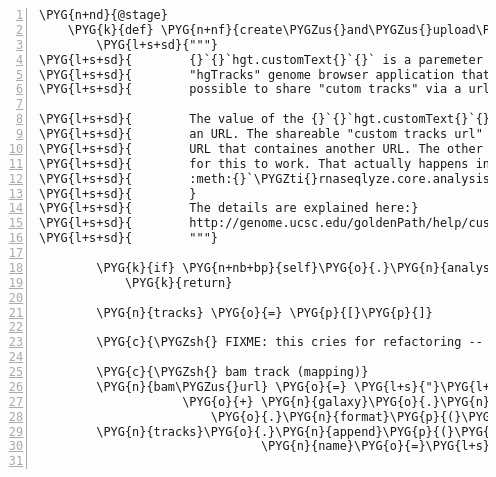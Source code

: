 \begin{Verbatim}[commandchars=\\\{\},numbers=left,firstnumber=1,stepnumber=5]
    \PYG{n+nd}{@stage}
    \PYG{k}{def} \PYG{n+nf}{create\PYGZus{}and\PYGZus{}upload\PYGZus{}hg\PYGZus{}text}\PYG{p}{(}\PYG{n+nb+bp}{self}\PYG{p}{)}\PYG{p}{:}
        \PYG{l+s+sd}{"""}
\PYG{l+s+sd}{        {}`{}`hgt.customText{}`{}` is a paremeter of the UCSC}
\PYG{l+s+sd}{        "hgTracks" genome browser application that makes it}
\PYG{l+s+sd}{        possible to share "cutom tracks" via a url.}

\PYG{l+s+sd}{        The value of the {}`{}`hgt.customText{}`{}` parameter is itself}
\PYG{l+s+sd}{        an URL. The shareable "custom tracks url" is therefore an}
\PYG{l+s+sd}{        URL that containes another URL. The other url must be "escaped"}
\PYG{l+s+sd}{        for this to work. That actually happens in}
\PYG{l+s+sd}{        :meth:{}`\PYGZti{}rnaseqlyze.core.analysis.AnalysisMixins.hg\PYGZus{}url{}`.}
\PYG{l+s+sd}{        }
\PYG{l+s+sd}{        The details are explained here:}
\PYG{l+s+sd}{        http://genome.ucsc.edu/goldenPath/help/customTrack.html\PYGZsh{}SHARE}
\PYG{l+s+sd}{        """}

        \PYG{k}{if} \PYG{n+nb+bp}{self}\PYG{o}{.}\PYG{n}{analysis}\PYG{o}{.}\PYG{n}{galaxy\PYGZus{}hg\PYGZus{}text}\PYG{p}{:}
            \PYG{k}{return}

        \PYG{n}{tracks} \PYG{o}{=} \PYG{p}{[}\PYG{p}{]}

        \PYG{c}{\PYGZsh{} FIXME: this cries for refactoring -- with logging!}

        \PYG{c}{\PYGZsh{} bam track (mapping)}
        \PYG{n}{bam\PYGZus{}url} \PYG{o}{=} \PYG{l+s}{"}\PYG{l+s}{https://}\PYG{l+s}{"} \PYG{o}{+} \PYG{n}{galaxy}\PYG{o}{.}\PYG{n}{hostname} \PYGZbs{}
                    \PYG{o}{+} \PYG{n}{galaxy}\PYG{o}{.}\PYG{n}{ucsc\PYGZus{}bam\PYGZus{}path\PYGZus{}template} \PYGZbs{}
                        \PYG{o}{.}\PYG{n}{format}\PYG{p}{(}\PYG{n}{dataset}\PYG{o}{=}\PYG{n+nb+bp}{self}\PYG{o}{.}\PYG{n}{analysis}\PYG{o}{.}\PYG{n}{galaxy\PYGZus{}bam}\PYG{o}{.}\PYG{n}{id}\PYG{p}{)}
        \PYG{n}{tracks}\PYG{o}{.}\PYG{n}{append}\PYG{p}{(}\PYG{n}{BAMTrack}\PYG{p}{(}\PYG{n}{url}\PYG{o}{=}\PYG{n}{bam\PYGZus{}url}\PYG{p}{,}
                               \PYG{n}{name}\PYG{o}{=}\PYG{l+s}{"}\PYG{l+s}{RNA-Seqlyze \textbar{} }\PYG{l+s+si}{\PYGZpc{}s}\PYG{l+s}{"} \PYG{o}{\PYGZpc{}} \PYG{n+nb+bp}{self}\PYG{o}{.}\PYG{n}{bam\PYGZus{}name}\PYG{p}{)}\PYG{p}{)}


\end{Verbatim}
